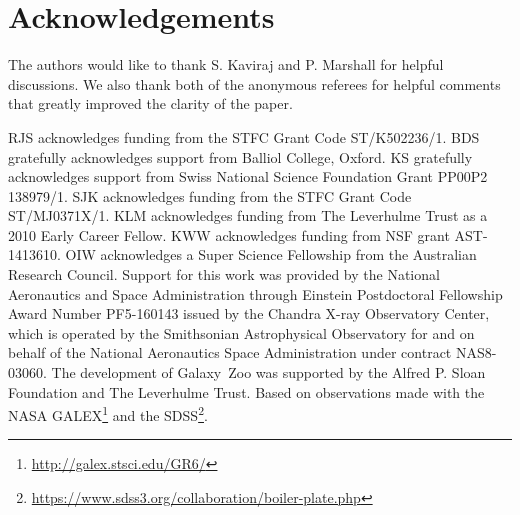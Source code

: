 \documentclass[useAMS,usenatbib]{mn2e}
\def\newref    {\color{new} }
\begin{document}
\section*{Acknowledgements}

The authors would like to thank S. Kaviraj and P. Marshall for helpful discussions. We also thank {\newref both of the} anonymous referees for helpful comments that greatly improved the clarity of the paper. 

RJS acknowledges funding from the STFC Grant Code ST/K502236/1. BDS gratefully acknowledges support from Balliol College, Oxford. KS gratefully acknowledges support from Swiss National Science Foundation Grant PP00P2 138979/1. SJK acknowledges funding from the STFC Grant Code ST/MJ0371X/1. KLM acknowledges funding from The Leverhulme Trust as a 2010 Early Career Fellow. KWW acknowledges funding from NSF grant AST-1413610. OIW acknowledges a Super Science Fellowship from the Australian Research Council. Support for this work was provided by the National Aeronautics and Space Administration through Einstein Postdoctoral Fellowship Award Number PF5-160143 issued by the Chandra X-ray Observatory Center, which is operated by the Smithsonian Astrophysical Observatory for and on behalf of the National Aeronautics Space Administration under contract NAS8-03060. The development of Galaxy~Zoo was supported by the Alfred P. Sloan Foundation and The Leverhulme Trust. Based on observations made with the NASA GALEX\footnote{\url{http://galex.stsci.edu/GR6/}} and the SDSS\footnote{\url{https://www.sdss3.org/collaboration/boiler-plate.php}}.

\end{document}
